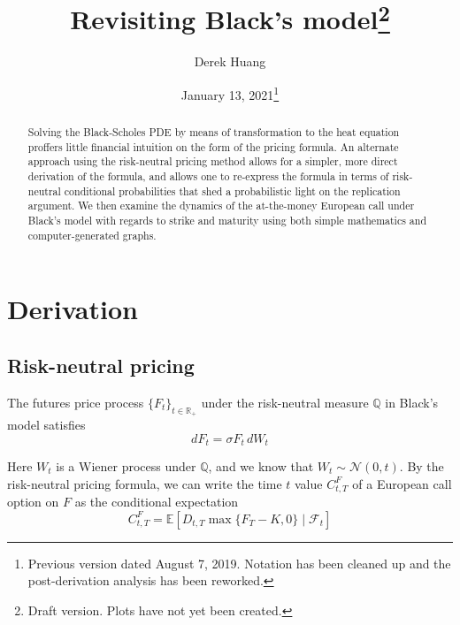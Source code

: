 \documentclass{article}
\title{Revisiting Black's model\thanks{
    Draft version. Plots have not yet been created.
}}
\author{Derek Huang}
\date{January 13, 2021\thanks{
    Previous version dated August 7, 2019. Notation has been cleaned up and the
    post-derivation analysis has been reworked.
}}
\numberwithin{equation}{section}
\begin{document}
\maketitle

\begin{abstract}
    Solving the Black-Scholes PDE by means of transformation to the heat
    equation\footnotemark{}
    proffers little financial intuition on the form of the pricing formula. An
    alternate approach using the risk-neutral pricing method allows for a
    simpler, more direct derivation of the formula, and allows one to re-express
    the formula in terms of risk-neutral conditional probabilities that shed a
    probabilistic light on the replication argument. We then examine the
    dynamics of the at-the-money European call under Black's model with regards
    to strike and maturity using both simple mathematics and computer-generated
    graphs.
\end{abstract}

\section{Derivation}

\subsection{Risk-neutral pricing}

The futures price process $ \{F_t\}_{t \in \mathbb{R}_+} $ under the
risk-neutral measure $ \mathbb{Q} $ in Black's model satisfies
\begin{equation} \label{black_dgbm}
    dF_t = \sigma F_t\,dW_t
\end{equation}

Here $ W_t $ is a Wiener process under $ \mathbb{Q} $, and we know that
$ W_t \sim \mathcal{N}(0, t) $. By the risk-neutral pricing formula, we can
write the time $ t $ value $ C_{t, T}^F $ of a European call option on $ F $ as
the conditional expectation
\begin{equation*}
    C_{t, T}^F = \mathbb{E}[D_{t, T}\max\{F_T - K, 0\} \mid \mathcal{F}_t]
\end{equation*}
\end{document}
